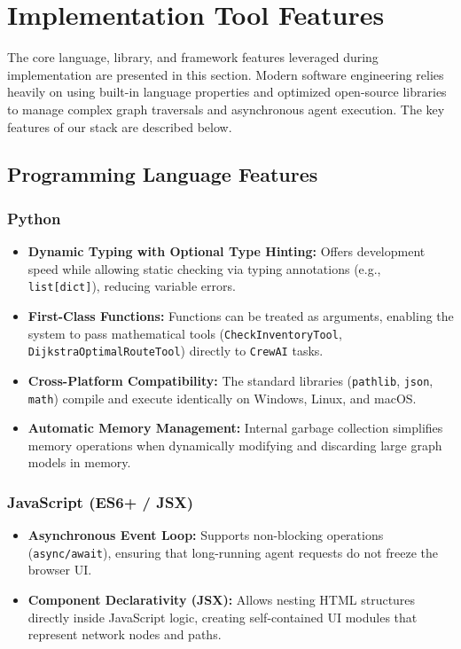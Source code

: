 \section[Implementation Tool Features]{Implementation Tool Features}
The core language, library, and framework features leveraged during implementation are presented in this section. Modern software engineering relies heavily on using built-in language properties and optimized open-source libraries to manage complex graph traversals and asynchronous agent execution. The key features of our stack are described below.

\subsection[Programming Language Features]{Programming Language Features}

\subsubsection{Python}
\begin{itemize}
    \item \textbf{Dynamic Typing with Optional Type Hinting:} Offers development speed while allowing static checking via typing annotations (e.g., \texttt{list[dict]}), reducing variable errors.
    \item \textbf{First-Class Functions:} Functions can be treated as arguments, enabling the system to pass mathematical tools (\texttt{CheckInventoryTool}, \texttt{DijkstraOptimalRouteTool}) directly to \texttt{CrewAI} tasks.
    \item \textbf{Cross-Platform Compatibility:} The standard libraries (\texttt{pathlib}, \texttt{json}, \texttt{math}) compile and execute identically on Windows, Linux, and macOS.
    \item \textbf{Automatic Memory Management:} Internal garbage collection simplifies memory operations when dynamically modifying and discarding large graph models in memory.
\end{itemize}

\subsubsection{JavaScript (ES6+ / JSX)}
\begin{itemize}
    \item \textbf{Asynchronous Event Loop:} Supports non-blocking operations (\texttt{async/await}), ensuring that long-running agent requests do not freeze the browser UI.
    \item \textbf{Component Declarativity (JSX):} Allows nesting HTML structures directly inside JavaScript logic, creating self-contained UI modules that represent network nodes and paths.
\end{itemize}

